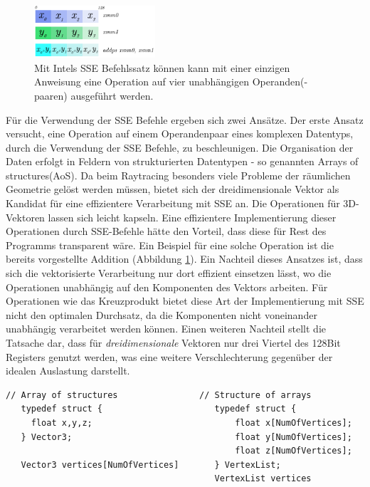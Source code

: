 \begin{figure}\centering
\includegraphics[width=0.4\textwidth]{images/sse1.pdf} 
\caption[SSE Beispiel: Addition]{Mit Intels SSE Befehlssatz können kann mit einer einzigen Anweisung eine Operation auf vier unabhängigen Operanden(-paaren) ausgeführt werden.}
\label{fig:sseadd}
\end{figure}

Für die Verwendung der SSE Befehle ergeben sich zwei Ansätze. Der erste Ansatz versucht, eine Operation auf einem Operandenpaar eines komplexen Datentyps, durch die Verwendung der SSE Befehle, zu beschleunigen. Die Organisation der Daten erfolgt in Feldern von strukturierten Datentypen - so genannten Arrays of structures(AoS). Da beim Raytracing besonders viele Probleme der räumlichen Geometrie gelöst werden müssen, bietet sich der dreidimensionale Vektor als Kandidat für eine effizientere Verarbeitung mit SSE an. 
Die Operationen für 3D-Vektoren lassen sich leicht kapseln. Eine effizientere Implementierung dieser Operationen durch SSE-Befehle hätte den Vorteil, dass diese für Rest des Programms transparent wäre.
Ein Beispiel für eine solche Operation ist die bereits vorgestellte Addition (Abbildung \ref{fig:sseadd}). Ein Nachteil dieses Ansatzes ist, dass sich die vektorisierte Verarbeitung nur dort effizient einsetzen lässt, wo die Operationen unabhängig auf den Komponenten des Vektors arbeiten. Für Operationen wie das Kreuzprodukt bietet diese Art der Implementierung mit SSE nicht den optimalen Durchsatz, da die Komponenten nicht voneinander unabhängig verarbeitet werden können. Einen weiteren Nachteil stellt die Tatsache dar, dass für \textit{dreidimensionale} Vektoren nur drei Viertel des 128Bit Registers genutzt werden, was eine weitere Verschlechterung gegenüber der idealen Auslastung darstellt.

\begin{lstlisting}[belowcaptionskip=8pt,float,caption={[\textit{Structure of arrays Anordnung} im Vergleich zum \textit{Array of structures}]Die Anordnung der Daten im "Structure of arrays"-Layout ermöglicht eine  effizientere Nutzung des SSE Befehlssatzes},label=src:aosvssoa]
   // Array of structures                // Structure of arrays
   typedef struct {                      typedef struct {
     float x,y,z;                            float x[NumOfVertices];
   } Vector3;                                float y[NumOfVertices];
                                             float z[NumOfVertices];
   Vector3 vertices[NumOfVertices]       } VertexList;
                                         VertexList vertices
\end{lstlisting}

